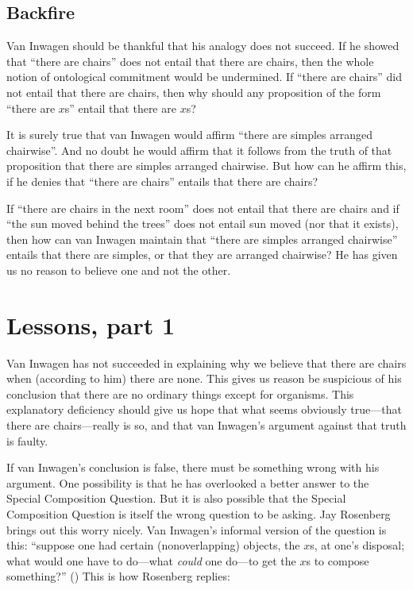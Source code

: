 \documentclass[11pt]{article}
\begin{document}
\begin{spacing}{1.5}
\subsection{Backfire}
\label{backfire}
Van Inwagen should be thankful that his analogy does not succeed.  If
he showed that ``there are chairs'' does not entail that there are
chairs, then the whole notion of ontological commitment would be
undermined.  If ``there are chairs'' did not entail that there are
chairs, then why should any proposition of the form ``there are $x$s''
entail that there are $x$s?

It is surely true that van Inwagen would affirm ``there are simples
arranged chairwise''.  And no doubt he would affirm that it follows
from the truth of that proposition that there are simples arranged
chairwise.  But how can he affirm this, if he denies that ``there are
chairs'' entails that there are chairs?

If ``there are chairs in the next room'' does not entail that there
are chairs and if ``the sun moved behind the trees'' does not entail
sun moved (nor that it exists), then how can van Inwagen maintain that
``there are simples arranged chairwise'' entails that there are
simples, or that they are arranged chairwise?  He has given us no
reason to believe one and not the other.

\section{Lessons, part 1}
\label{lessons-v}
Van Inwagen has not succeeded in explaining why we believe that there
are chairs when (according to him) there are none.  This gives us
reason be suspicious of his conclusion that there are no ordinary
things except for organisms.  This explanatory deficiency should give
us hope that what seems obviously true---that there are
chairs---really is so, and that van Inwagen's argument against that
truth is faulty.

If van Inwagen's conclusion is false, there must be something wrong
with his argument.  One possibility is that he has overlooked a better
answer to the Special Composition Question.  But it is also possible
that the Special Composition Question is itself the wrong question to
be asking.  Jay Rosenberg brings out this worry nicely.  Van Inwagen's
informal version of the question is this: ``suppose one had certain
(nonoverlapping) objects, the $x$s, at one's disposal; what would one
have to do---what {\em could} one do---to get the $x$s to compose
something?''  (\citeyear[31]{inwagen1995}) This is how Rosenberg
replies:


\end{spacing}
\end{document}
